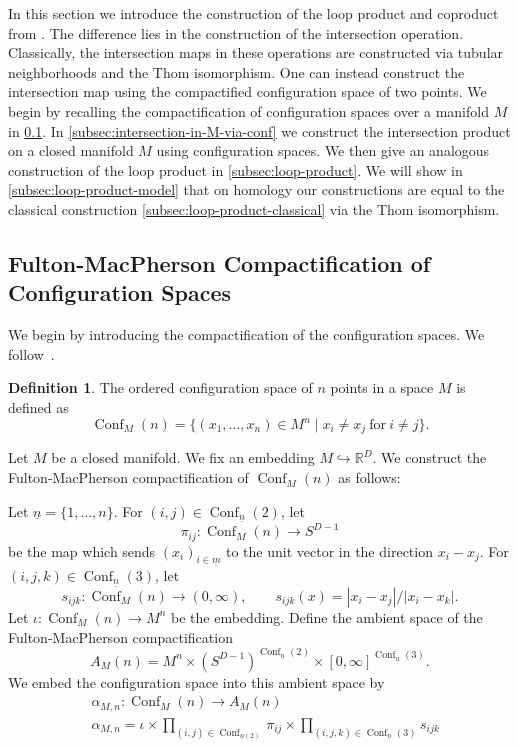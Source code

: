 \documentclass{scrartcl}
\theoremstyle{plain}
\theoremstyle{definition}
\newtheorem{definition}[theorem]{Definition}
\newcommand{\R}{\mathbb R}
\newcommand{\abs}[1]{\left\lvert#1\right\rvert}
\DeclareMathOperator{\Conf}{Conf}
\begin{document}
In this section we introduce the construction of the loop product and coproduct from \cite{naef2019string}. The difference lies in the construction of the intersection operation. Classically, the intersection maps in these operations are constructed via tubular neighborhoods and the Thom isomorphism. One can instead construct the intersection map using the compactified configuration space of two points. We begin by recalling the compactification of configuration spaces over a manifold $M$ in \cref{subsec:compactificatified-configuration-space}. In \cref{subsec:intersection-in-M-via-conf} we construct the intersection product on a closed manifold $M$ using configuration spaces. We then give an analogous construction of the loop product in \cref{subsec:loop-product}. We will show in \ref{subsec:loop-product-model} that on homology our constructions are equal to the classical construction \ref{subsec:loop-product-classical} via the Thom isomorphism. 

\subsection{Fulton-MacPherson Compactification of Configuration Spaces}\label{subsec:compactificatified-configuration-space}

We begin by introducing the compactification of the configuration spaces. We follow~\cite{sinha2004manifold}.

\begin{definition}
The ordered configuration space of $n$ points in a space $M$ is defined as $$\Conf_M(n) = \{(x_1, \dots, x_n)\in M^n\mid x_i\neq x_j\ \text{for}\ i\neq j\}.$$ 
\end{definition}

Let $M$ be a closed manifold. We fix an embedding $M \hookrightarrow \R^D$. We construct the Fulton-MacPherson compactification of $\Conf_M(n)$ as follows:

Let $\underline n=\{1,\dots,n\}$. For $(i,j)\in \Conf_{\underline n}(2)$, let $$\pi_{ij}\colon \Conf_M(n)\to S^{D-1}$$ be the map which sends $(x_i)_{i\in\underline m}$ to the unit vector in the direction $x_i-x_j$. For $(i,j,k)\in\Conf_{\underline n}(3)$, let $$s_{ijk}\colon \Conf_{M}(n) \to (0, \infty), \qquad s_{ijk}(x) = \abs{x_i-x_j} / \abs{x_i-x_k}.$$ Let $\iota\colon\Conf_M(n)\to M^n$ be the embedding. Define the ambient space of the Fulton-MacPherson compactification $$A_M(n) = M^{n} \times (S^{D-1})^{\Conf_{\underline n}(2)} \times [0, \infty]^{\Conf_{\underline n}(3)}.$$ We embed the configuration space into this ambient space by 
\begin{align*}
    &\alpha_{M,n} \colon \Conf_M(n) \to A_M(n)\\
    &\alpha_{M,n} = \iota \times \prod_{(i,j)\in \Conf_{\underline n(2)}}\pi_{ij} \times \prod_{(i, j, k)\in\Conf_{\underline n}(3)}s_{ijk}
\end{align*}
\end{document}
